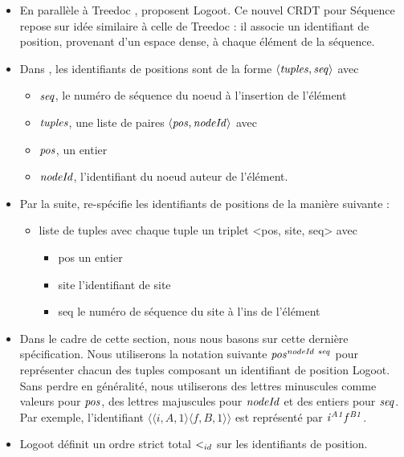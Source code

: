 \begin{itemize}
  \item En parallèle à Treedoc \cite{2009-treedoc-preguica}, \textcite{2009-logoot-weiss} proposent Logoot.
    Ce nouvel \ac{CRDT} pour Séquence repose sur idée similaire à celle de Treedoc : il associe un identifiant de position, provenant d'un espace dense, à chaque élément de la séquence.
  \item Dans \cite{2009-logoot-weiss}, les identifiants de positions sont de la forme $\langle \mathit{tuples},\mathit{seq} \rangle$ avec
  \begin{itemize}
    \item $\mathit{seq}$, le numéro de séquence du noeud à l'insertion de l'élément
    \item $\mathit{tuples}$, une liste de paires $\langle \mathit{pos},\mathit{nodeId} \rangle$ avec
    \item $\mathit{pos}$, un entier
    \item $\mathit{nodeId}$, l'identifiant du noeud auteur de l'élément.
  \end{itemize}
  \item Par la suite, \cite{2010-logoot-undo-weiss} re-spécifie les identifiants de positions de la manière suivante :
  \begin{itemize}
    \item liste de tuples avec chaque tuple un triplet <pos, site, seq> avec
    \begin{itemize}
      \item pos un entier
      \item site l'identifiant de site
      \item seq le numéro de séquence du site à l'ins de l'élément
    \end{itemize}
  \end{itemize}
  \item Dans le cadre de cette section, nous nous basons sur cette dernière spécification.
    Nous utiliserons la notation suivante $\mathit{pos}^{\mathit{nodeId~seq}}_{\mathit{}}$ pour représenter chacun des tuples composant un identifiant de position Logoot.
    Sans perdre en généralité, nous utiliserons des lettres minuscules comme valeurs pour $\mathit{pos}$, des lettres majuscules pour $\mathit{nodeId}$ et des entiers pour $\mathit{seq}$.
    Par exemple, l'identifiant $\langle \langle i,A,1 \rangle \langle f,B,1 \rangle \rangle$ est représenté par $\mathit{i}^{\mathit{A1}}_{\mathit{}}\mathit{f}^{\mathit{B1}}_{\mathit{}}$.
  \item Logoot définit un ordre strict total $<_{id}$ sur les identifiants de position.

\end{itemize}
